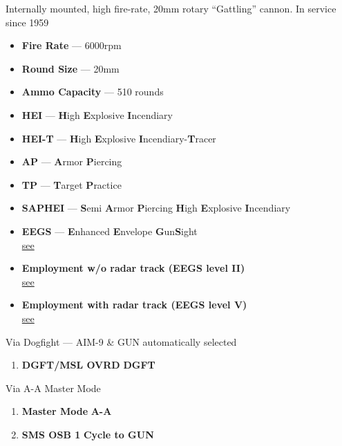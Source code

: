 \begin{tcoloritemize}
    \blueitem[M-61 Vulcan]
    Internally mounted, high fire-rate, 20mm rotary ``Gattling'' cannon.
    In service since 1959

    \begin{itemize}
        \item \textbf{Fire Rate} --- 6000rpm
        \item \textbf{Round Size} --- 20mm
        \item \textbf{Ammo Capacity} --- 510 rounds
    \end{itemize}
    \begin{itemize}
        \item \textbf{HEI} --- \textbf{H}igh \textbf{E}xplosive \textbf{I}ncendiary
        \item \textbf{HEI-T} --- \textbf{H}igh \textbf{E}xplosive \textbf{I}ncendiary-\textbf{T}racer
        \item \textbf{AP} --- \textbf{A}rmor \textbf{P}iercing
        \item \textbf{TP} --- \textbf{T}arget \textbf{P}ractice
        \item \textbf{SAPHEI} --- \textbf{S}emi \textbf{A}rmor \textbf{P}iercing \textbf{H}igh \textbf{E}xplosive \textbf{I}ncendiary
    \end{itemize}
    \begin{itemize}
        \item \textbf{EEGS} --- \textbf{E}nhanced \textbf{E}nvelope \textbf{G}un\textbf{S}ight \\
        \hyperref[subsec:m61:eegssymb]{see }
        \item \textbf{Employment w/o radar track (EEGS level II)} \\
        \hyperref[subsec:m61:eegslvl2]{see }
        \item \textbf{Employment with radar track (EEGS level V)} \\
        \hyperref[subsec:m61:eegslvl5]{see }
    \end{itemize}
    Via Dogfight --- AIM-9 \& GUN automatically selected

    \begin{enumerate}
        \item \textbf{DGFT/MSL OVRD} \dotfill \textbf{DGFT}
    \end{enumerate}

    Via A-A Master Mode

    \begin{enumerate}
        \item \textbf{Master Mode} \dotfill \textbf{A-A}
        \item \textbf{SMS OSB 1} \dotfill \textbf{Cycle to GUN}
    \end{enumerate}
\end{tcoloritemize}

